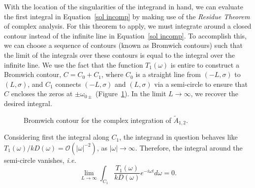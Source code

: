 With the location of the singularities of the integrand in hand, we can evaluate the first integral in Equation~\eqref{sol incomp} by making use of the \textit{Residue Theorem} of complex analysis. For this theorem to apply, we must integrate around a closed contour instead of the infinite line in Equation~\eqref{sol incomp}. To accomplish this, we can choose a sequence of contours (known as Bromwich contours) such that the limit of the integrals over these contours is equal to the integral over the infinite line. We use the fact that the function $T_1(\omega)$ is entire to construct a Bromwich contour, $C = C_0 + C_1$, where $C_0$ is a straight line from $(-L, \sigma)$ to $(L, \sigma)$, and $C_1$ connects $(-L, \sigma)$ and $(L, \sigma)$ via a semi-circle to ensure that $C$ encloses the zeros at $\pm\omega_{0\pm}$ (Figure~\ref{fig: brom cont incomp}). In the limit $L \to \infty$, we recover the desired integral.

\begin{figure}
	\centering
	\caption{Bromwich contour for the complex integration of $\tilde{A}_{1,2}$.}
	\label{fig: brom cont incomp}
\end{figure}
Considering first the integral along $C_1$, the integrand in question behaves like $T_1(\omega)/kD(\omega) = \mathcal{O}(|\omega|^{-2})$, as $|\omega| \to \infty$. Therefore, the integral around the semi-circle vanishes, \textit{i.e.}
\begin{equation}
\lim_{L \to \infty} \int_{C_1} \frac{T_1(\omega)}{kD(\omega)} e^{-i\omega t} d\omega = 0.
\end{equation}

